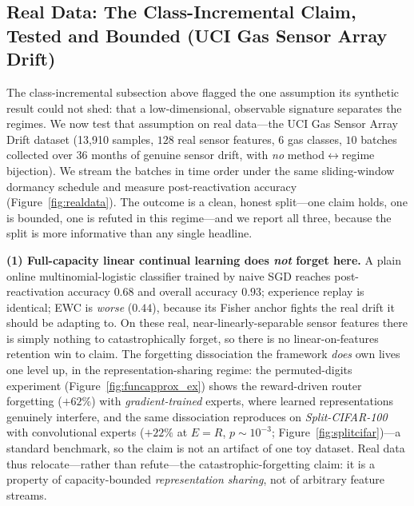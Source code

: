 \documentclass[10pt]{article}
\begin{document}
\subsection{Real Data: The Class-Incremental Claim, Tested and Bounded
(UCI Gas Sensor Array Drift)}
\label{sec:realdata}

The class-incremental subsection above flagged the one assumption its synthetic
result could not shed: that a low-dimensional, observable signature separates the
regimes. We now test that assumption on real data---the UCI Gas Sensor Array Drift
dataset (13{,}910 samples, $128$ real sensor features, $6$ gas classes, $10$ batches
collected over $36$ months of genuine sensor drift, with \emph{no} method$\leftrightarrow$regime
bijection). We stream the batches in time order under the same sliding-window
dormancy schedule and measure post-reactivation accuracy
(Figure~\ref{fig:realdata}). The outcome is a clean, honest split---one claim holds,
one is bounded, one is refuted in this regime---and we report all three, because the
split is more informative than any single headline.

\textbf{(1) Full-capacity linear continual learning does \emph{not} forget here.}
A plain online multinomial-logistic classifier trained by naive SGD reaches
post-reactivation accuracy $0.68$ and overall accuracy $0.93$; experience replay is
identical; EWC is \emph{worse} ($0.44$), because its Fisher anchor fights the real
drift it should be adapting to. On these real, near-linearly-separable sensor
features there is simply nothing to catastrophically forget, so there is no
linear-on-features retention win to claim. The forgetting dissociation the framework
\emph{does} own lives one level up, in the representation-sharing regime: the
permuted-digits experiment (Figure~\ref{fig:funcapprox_ex}) shows the reward-driven
router forgetting ($+62\%$) with \emph{gradient-trained} experts, where learned
representations genuinely interfere, and the same dissociation reproduces on
\emph{Split-CIFAR-100} with convolutional experts ($+22\%$ at $E{=}R$,
$p\sim10^{-3}$; Figure~\ref{fig:splitcifar})---a standard benchmark, so the claim is
not an artifact of one toy dataset. Real data thus relocate---rather than
refute---the catastrophic-forgetting claim: it is a property of capacity-bounded
\emph{representation sharing}, not of arbitrary feature streams.
\end{document}
